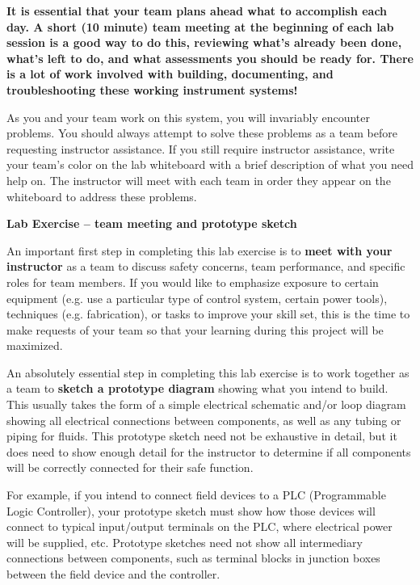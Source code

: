 \documentclass[12pt,a4paper]{article}
\begin{document}
\begin{itemize}
\vskip 10pt

{\bf It is essential that your team plans ahead what to accomplish each day.  A short (10 minute) team meeting at the beginning of each lab session is a good way to do this, reviewing what's already been done, what's left to do, and what assessments you should be ready for.  There is a lot of work involved with building, documenting, and troubleshooting these working instrument systems!}

As you and your team work on this system, you will invariably encounter problems.  You should always attempt to solve these problems as a team before requesting instructor assistance.  If you still require instructor assistance, write your team's color on the lab whiteboard with a brief description of what you need help on.  The instructor will meet with each team in order they appear on the whiteboard to address these problems.





\vfil \eject

\noindent
{\bf Lab Exercise -- team meeting and prototype sketch}

\vskip 5pt

An important first step in completing this lab exercise is to {\bf meet with your instructor} as a team to discuss safety concerns, team performance, and specific roles for team members.  If you would like to emphasize exposure to certain equipment (e.g. use a particular type of control system, certain power tools), techniques (e.g. fabrication), or tasks to improve your skill set, this is the time to make requests of your team so that your learning during this project will be maximized.

\vskip 10pt

An absolutely essential step in completing this lab exercise is to work together as a team to {\bf sketch a prototype diagram} showing what you intend to build.  This usually takes the form of a simple electrical schematic and/or loop diagram showing all electrical connections between components, as well as any tubing or piping for fluids.  This prototype sketch need not be exhaustive in detail, but it does need to show enough detail for the instructor to determine if all components will be correctly connected for their safe function.

For example, if you intend to connect field devices to a PLC (Programmable Logic Controller), your prototype sketch must show how those devices will connect to typical input/output terminals on the PLC, where electrical power will be supplied, etc.  Prototype sketches need not show all intermediary connections between components, such as terminal blocks in junction boxes between the field device and the controller.


\end{itemize}
\end{document}
